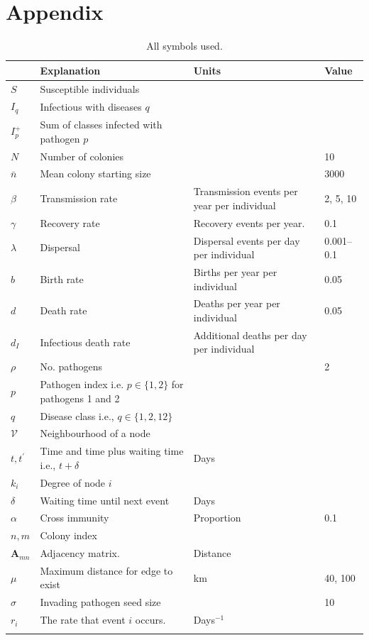 
\clearpage
\section{Appendix}


\begin{table}[b!]

\begin{tabular}{lp{5.6cm}p{4.3cm}l}
 & Explanation & Units&Value\\
\hline
$S$ & Susceptible individuals &&\\
$I_q$ & Infectious with diseases $q$ &&\\
$I^+_p$ & Sum of classes infected with pathogen $p$ &\\
$N$ & Number of colonies&& 10\\
$\bar{n}$ & Mean colony starting size && 3000\\
$\beta$ & Transmission rate & Transmission events per year per individual& 2, 5, 10\\
$\gamma$ & Recovery rate & Recovery events per year. & 0.1\\
$\lambda$ & Dispersal & Dispersal events per day per individual& 0.001--0.1\\
$b$ & Birth rate & Births per year per individual& 0.05\\
$d$ & Death rate & Deaths per year per individual & 0.05\\
$d_I$ & Infectious death rate & Additional deaths per day per individual&\\
$\rho$ & No. pathogens && 2\\
$p$ &  Pathogen index i.e. $p\in\{1,2\}$ for pathogens 1 and 2 & &\\
$q$ & Disease class i.e., $q\in\{1,2,12\}$&\\
$\mathcal{V}$ & Neighbourhood of a node &&\\
$t, t^\prime$ & Time and time plus waiting time i.e., $t+\delta$ & Days&\\
$k_i$ & Degree of node $i$ &&\\
$\delta$ & Waiting time until next event & Days&\\
$\alpha$ & Cross immunity & Proportion& 0.1\\
$n, m$ & Colony index &&\\
$\bm{A}_{mn}$ & Adjacency matrix. & Distance &\\
$\mu$ & Maximum distance for edge to exist & km& 40, 100\\
$\sigma$ & Invading pathogen seed size & & 10\\
$r_i$ & The rate that event $i$ occurs. & Days$^{-1}$&\\
&&&\\
\end{tabular}
\caption{All symbols used.}
\label{t:params}
\end{table}




